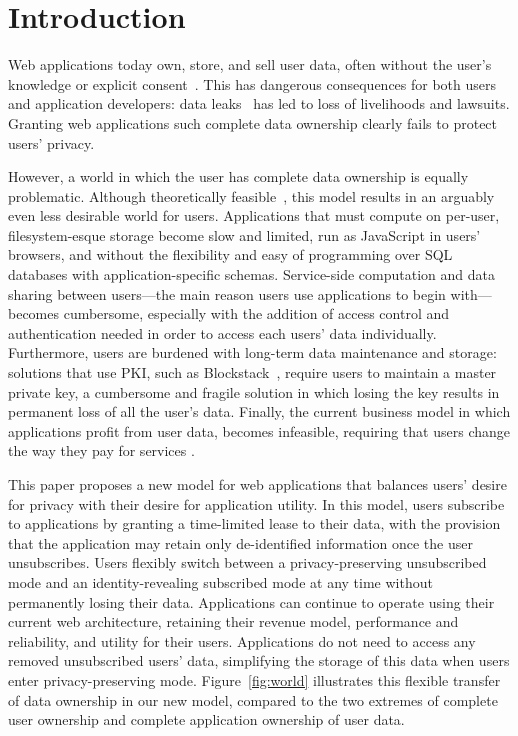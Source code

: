 \section{Introduction}

Web applications today own, store, and sell user data, often without the user's knowledge or
explicit consent~\cite{nytimes:fb, npr:data}. This has dangerous consequences for both users and
application developers: data leaks~\cite{breach:twitter, breach:fb, breach:marriott, breach:quora}
has led to loss of livelihoods and lawsuits. Granting web applications such complete data
ownership clearly fails to protect users' privacy. 

However, a world in which the user has complete data ownership is equally problematic. Although
theoretically feasible~\cite{amber, w5, blockstack, bstore}, this model results in an arguably even
less desirable world for users. 
%
Applications that must compute on per-user, filesystem-esque storage become slow and limited, run
as JavaScript in users' browsers, and without the flexibility and easy of programming over SQL
databases with application-specific schemas.  Service-side computation and data sharing between
users---the main reason users use applications to begin with---becomes cumbersome, especially with
the addition of access control and authentication needed in order to access each users' data
individually. Furthermore, users are burdened with long-term data maintenance and storage: solutions
that use PKI, such as Blockstack~\cite{blockstack}, require users to maintain a master private key,
a cumbersome and fragile solution in which losing the key results in permanent loss of all the
user's data.
%
Finally, the current business model in which applications profit from user data, becomes infeasible,
requiring that users change the way they pay for services .

This paper proposes a new model for web applications that balances users' desire for privacy with
their desire for application utility. In this model, users subscribe to applications by granting a
time-limited lease to their data, with the provision that the application may retain only
de-identified information once the user unsubscribes. Users flexibly switch between a
privacy-preserving unsubscribed mode and an identity-revealing subscribed mode at any time without
permanently losing their data. Applications can continue to operate using their current web
architecture, retaining their revenue model, performance and reliability, and utility for their
users. Applications do not need to access any removed unsubscribed users' data, simplifying the
storage of this data when users enter privacy-preserving mode.
Figure~\ref{fig:world} illustrates this flexible transfer of data ownership in our new model,
compared to the two extremes of complete user ownership and complete application ownership of user
data.

